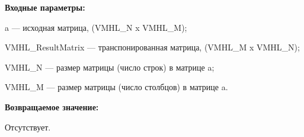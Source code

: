 \textbf{Входные параметры:}

 a --- исходная матрица, (VMHL\_N x VMHL\_M);
 
 VMHL\_ResultMatrix --- транспонированная матрица, (VMHL\_M x VMHL\_N);
 
 VMHL\_N --- размер матрицы (число строк) в матрице a;
 
 VMHL\_M --- размер матрицы (число столбцов) в матрице a.

\textbf{Возвращаемое значение:}

Отсутствует.